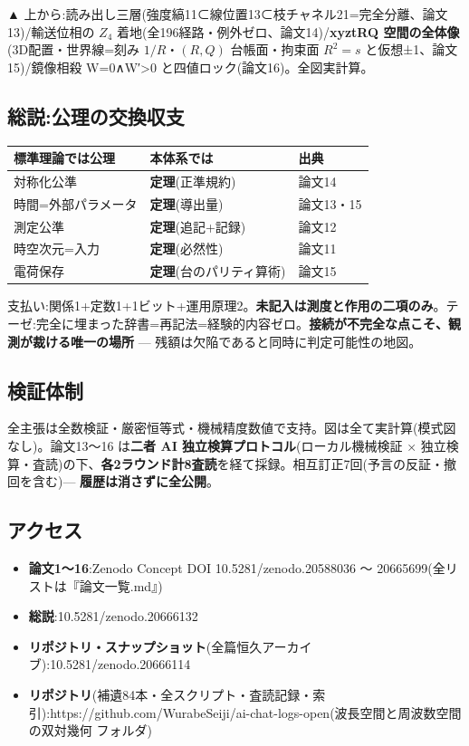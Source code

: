\documentclass[
  10pt,
]{ltjsarticle}
\newcounter{none} %
\providecommand{\tightlist}{%
  \setlength{\itemsep}{0pt}\setlength{\parskip}{0pt}}
\begin{document}
▲
上から:読み出し三層(強度縞11⊂線位置13⊂枝チャネル21=完全分離、論文13)/輸送位相の
\(Z_4\) 着地(全196経路・例外ゼロ、論文14)/\textbf{xyztRQ
空間の全体像}(3D配置・世界線=刻み \(1/R\)・\((R,Q)\) 台帳面・拘束面
\(R^2=s\) と仮想±1、論文15)/鏡像相殺 W=0∧W′\textgreater0
と四値ロック(論文16)。全図実計算。

\subsection{総説:公理の交換収支}\label{ux7dcfux8aacux516cux7406ux306eux4ea4ux63dbux53ceux652f}

{\def\LTcaptype{none} %
\begin{longtable}[]{@{}lll@{}}
\toprule\noalign{}
標準理論では公理 & 本体系では & 出典 \\
\midrule\noalign{}
\endhead
\bottomrule\noalign{}
\endlastfoot
対称化公準 & \textbf{定理}(正準規約) & 論文14 \\
時間=外部パラメータ & \textbf{定理}(導出量) & 論文13・15 \\
測定公準 & \textbf{定理}(追記+記録) & 論文12 \\
時空次元=入力 & \textbf{定理}(必然性) & 論文11 \\
電荷保存 & \textbf{定理}(台のパリティ算術) & 論文15 \\
\end{longtable}
}

支払い:関係1+定数1+1ビット+運用原理2。\textbf{未記入は測度と作用の二項のみ}。テーゼ:完全に埋まった辞書=再記法=経験的内容ゼロ。\textbf{接続が不完全な点こそ、観測が裁ける唯一の場所}
--- 残額は欠陥であると同時に判定可能性の地図。

\subsection{検証体制}\label{ux691cux8a3cux4f53ux5236}

全主張は全数検証・厳密恒等式・機械精度数値で支持。図は全て実計算(模式図なし)。論文13〜16
は\textbf{二者 AI 独立検算プロトコル}(ローカル機械検証 ×
独立検算・査読)の下、\textbf{各2ラウンド計8査読}を経て採録。相互訂正7回(予言の反証・撤回を含む)---
\textbf{履歴は消さずに全公開}。

\subsection{アクセス}\label{ux30a2ux30afux30bbux30b9}

\begin{itemize}
\tightlist
\item
  \textbf{論文1〜16}:Zenodo Concept DOI 10.5281/zenodo.20588036 〜
  20665699(全リストは『論文一覧.md』)
\item
  \textbf{総説}:10.5281/zenodo.20666132
\item
  \textbf{リポジトリ・スナップショット}(全篇恒久アーカイブ):10.5281/zenodo.20666114
\item
  \textbf{リポジトリ}(補遺84本・全スクリプト・査読記録・索引):https://github.com/WurabeSeiji/ai-chat-logs-open(波長空間と周波数空間の双対幾何
  フォルダ)
\end{itemize}
\end{document}
